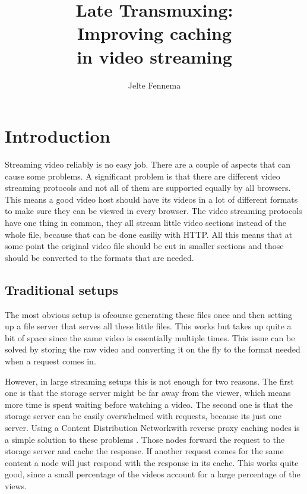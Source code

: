 \documentclass[twoside,openright]{uva-bachelor-thesis}
\title{Late Transmuxing:\\Improving caching \\in video streaming}
\author{Jelte Fennema}
\begin{document}
\maketitle

\begin{abstract}
\end{abstract}


\tableofcontents

\chapter{Introduction}
Streaming video reliably is no easy job. There are a couple of aspects that
can cause some problems. A significant problem is that there are different video
streaming protocols and not all of them are supported equally by all browsers.
This means a good video host should have its videos in a lot of different
formats to make sure they can be viewed in every browser. The video streaming
protocols have one thing in common, they all stream little video sections
instead of the whole file, because that can be done easiliy with
HTTP\autocite{http}. All this means that at some point the original video file
should be cut in smaller sections and those should be converted to the formats
that are needed.


\section{Traditional setups}
The most obvious setup is ofcourse generating these files once and then setting
up a file server that serves all these little files. This works but takes up
quite a bit of space since the same video is essentially multiple
times. This issue can be solved by storing the raw video and converting it on
the fly to the format needed when a request comes in.

However, in large streaming setups this is not enough for two reasons. The first
one is that the storage server might be far away from the viewer, which means
more time is spent waiting before watching a video. The second one is that the
storage server can be easily overwhelmed with requests, because its just one
server. Using a Content Distribution
Networkwith reverse proxy caching nodes is a simple solution to these problems
\autocites{cdns}{revproxy}.  Those nodes forward the request to the storage
server and cache the response. If another request comes for the same content a
node will just respond with the response in its cache. This works quite good,
since a small percentage of the videos account for a large percentage of the
views.
\end{document}
